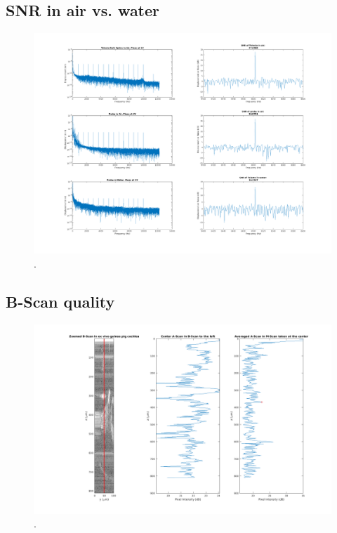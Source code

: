 \documentclass{article}
\begin{document}
\par{}

\subsection{SNR in air vs. water}

\par{}

\begin{figure}[!h]
	\centering
	\includegraphics[width=\textwidth]{Data for Probe Writeup/SNRcomp.png}
	\caption{.}
\end{figure}

\subsection{B-Scan quality}

\par{}

\begin{figure}[!h]
	\centering
	\includegraphics[width=\textwidth]{Data for Probe Writeup/Data 2022-2-17/BScan v AScan.png}
	\caption{.}
\end{figure}
\end{document}
